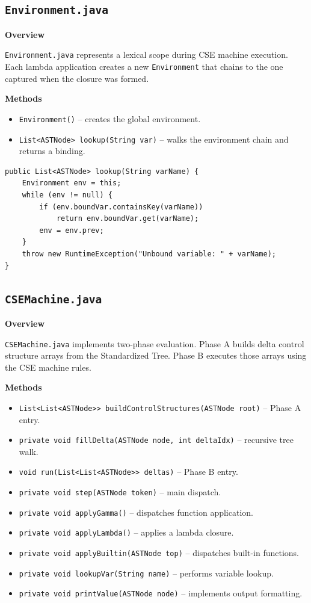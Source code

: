 \documentclass[12pt,a4paper]{article}
\begin{document}
\subsection{\texttt{Environment.java}}

\textbf{Overview}

\texttt{Environment.java} represents a lexical scope during CSE machine execution. Each lambda application creates a new \texttt{Environment} that chains to the one captured when the closure was formed.

\textbf{Methods}

\begin{itemize}
    \item \texttt{Environment()} -- creates the global environment.
    \item \texttt{List<ASTNode> lookup(String var)} -- walks the environment chain and returns a binding.
\end{itemize}

\begin{lstlisting}[style=javacode, caption={Environment.lookup()}]
public List<ASTNode> lookup(String varName) {
    Environment env = this;
    while (env != null) {
        if (env.boundVar.containsKey(varName))
            return env.boundVar.get(varName);
        env = env.prev;
    }
    throw new RuntimeException("Unbound variable: " + varName);
}
\end{lstlisting}

\subsection{\texttt{CSEMachine.java}}

\textbf{Overview}

\texttt{CSEMachine.java} implements two-phase evaluation. Phase A builds delta control structure arrays from the Standardized Tree. Phase B executes those arrays using the CSE machine rules.

\textbf{Methods}

\begin{itemize}
    \item \texttt{List<List<ASTNode>> buildControlStructures(ASTNode root)} -- Phase A entry.
    \item \texttt{private void fillDelta(ASTNode node, int deltaIdx)} -- recursive tree walk.
    \item \texttt{void run(List<List<ASTNode>> deltas)} -- Phase B entry.
    \item \texttt{private void step(ASTNode token)} -- main dispatch.
    \item \texttt{private void applyGamma()} -- dispatches function application.
    \item \texttt{private void applyLambda()} -- applies a lambda closure.
    \item \texttt{private void applyBuiltin(ASTNode top)} -- dispatches built-in functions.
    \item \texttt{private void lookupVar(String name)} -- performs variable lookup.
    \item \texttt{private void printValue(ASTNode node)} -- implements output formatting.
\end{itemize}
\end{document}
